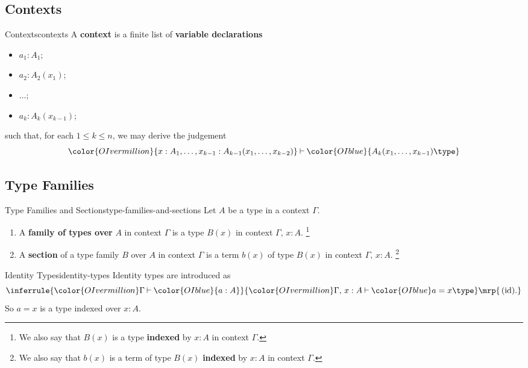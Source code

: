 \subsection{Contexts}\label{subsection-contexts}
\begin{definition}{Contexts}{contexts}%
    A \textbf{context} is a finite list of \textbf{variable declarations}
    \begin{itemize}
        \item $a_{1}:A_{1}$;
        \item $a_{2}:A_{2}(x_{1})$;
        \item $\ldots$;
        \item $a_{k}:A_{k}(x_{k-1})$;
    \end{itemize}
    such that, for each $1\leq k\leq n$, we may derive the judgement
    \[
        {\color{OIvermillion}{x:A_{1},\ldots,x_{k-1}:A_{k-1}(x_{1},\ldots,x_{k-2})}}%
        \mathbin{\vdash}%
        {\color{OIblue}{A_{k}(x_{1},\ldots,x_{k-1})\type}}%
    \]%
\end{definition}
\subsection{Type Families}\label{subsection-type-families}
\begin{definition}{Type Families and Sections}{type-families-and-sections}%
    Let $A$ be a type in a context $\Gamma$.
    \begin{enumerate}
        \item\label{type-families-and-sections-type-families}A \textbf{family of types over} $A$ in context $\Gamma$ is a type $B(x)$ in context $\Gamma,\,x:A$.%
            \footnote{%
                We also say that $B(x)$ is a type \textbf{indexed} by $x:A$ in context $\Gamma$.
            }%
        \item\label{type-families-and-sections-sections}A \textbf{section} of a type family $B$ over $A$ in context $\Gamma$ is a term $b(x)$ of type $B(x)$ in context $\Gamma,\,x:A$.%
            \footnote{%
                We also say that $b(x)$ is a term of type $B(x)$ \textbf{indexed} by $x:A$ in context $\Gamma$.
                \par\vspace*{\TCBBoxCorrection}
            }%
    \end{enumerate}
\end{definition}
\begin{example}{Identity Types}{identity-types}%
    Identity types are introduced as
    \[
        \inferrule{%
            {\color{OIvermillion}\Gamma}\mathbin{\vdash}{\color{OIblue}{a:A}}%
        }{%
            {\color{OIvermillion}\Gamma,\,x:A}\mathbin{\vdash}{{\color{OIblue}a=x\type}}%
        }%
        \mrp{\,(\text{id}).}%
    \]%
    So $a=x$ is a type indexed over $x:A$.
\end{example}
